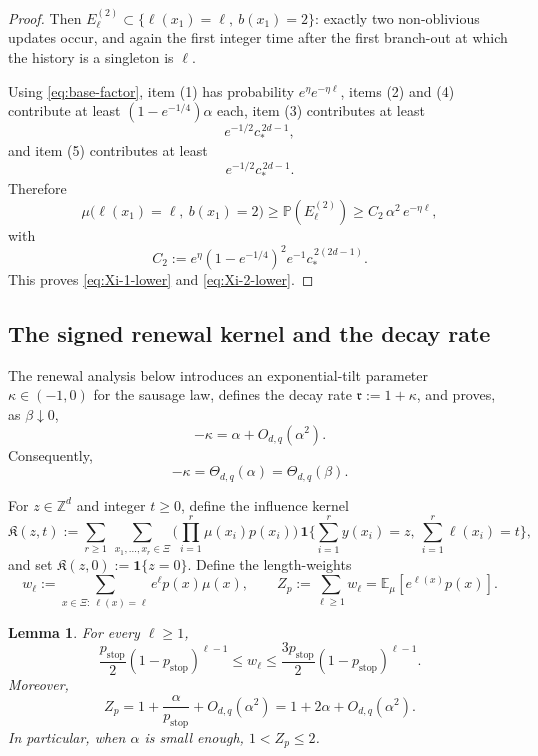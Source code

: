 \documentclass[letterpaper,11pt,reqno]{amsart}
\newtheorem{lemma}[thm]{Lemma}
\theoremstyle{definition}
\newcommand{\IK}{\mathfrak{K}}
\begin{document}
\begin{proof}
Then \(E^{(2)}_\ell\subset\{\ell(x_1)=\ell,\ b(x_1)=2\}\): exactly two non-oblivious updates occur, and again the first integer time after the first branch-out at which the history is a singleton is \(\ell\).

Using \eqref{eq:base-factor}, item (1) has probability \(e^\eta e^{-\eta\ell}\), items (2) and (4) contribute at least \((1-e^{-1/4})\alpha\) each, item (3) contributes at least
\[
e^{-1/2}c_*^{\,2d-1},
\]
and item (5) contributes at least
\[
e^{-1/2}c_*^{\,2d-1}.
\]
Therefore
\[
\mu\big(\ell(x_1)=\ell,\ b(x_1)=2\big)\ge \mathbb P(E^{(2)}_\ell)
\ge
C_2\,\alpha^2\,e^{-\eta\ell},
\]
with
\[
C_2:=e^\eta(1-e^{-1/4})^2e^{-1}c_*^{\,2(2d-1)}.
\]
This proves \eqref{eq:Xi-1-lower} and \eqref{eq:Xi-2-lower}.
\end{proof}



\subsection{The signed renewal kernel and the decay rate}
\label{subsec:signed-kernel}
The renewal analysis below introduces an exponential-tilt parameter
\(\kappa\in(-1,0)\) for the sausage law, defines the decay rate
\(\mathfrak r:=1+\kappa\), and proves, as \(\beta\downarrow0\),
\[
-\kappa=\alpha+O_{d,q}(\alpha^2).
\]
Consequently,
\[
-\kappa
=\Theta_{d,q}(\alpha)
=\Theta_{d,q}(\beta).
\]

For $z\in\mathbb Z^d$ and integer $t\ge0$, define the influence kernel
\begin{equation}\label{eq:IK-def}
\IK(z,t):=
\sum_{r\ge 1}\ \sum_{x_1,\ldots,x_r\in\Xi}
\Big(\prod_{i=1}^{r}\mu(x_i)p(x_i)\Big)\,
\mathbf 1\Big\{\sum_{i=1}^r y(x_i)=z,\ \sum_{i=1}^r \ell(x_i)=t\Big\},
\end{equation}
and set $\IK(z,0):=\mathbf 1\{z=0\}$.
Define the length-weights
\begin{equation*}
w_\ell:=\sum_{x\in\Xi:\ \ell(x)=\ell}e^{\ell}p(x)\mu(x),
\qquad
Z_p:=\sum_{\ell\ge 1}w_\ell=\mathbb E_\mu[e^{\ell(x)}p(x)].
\end{equation*}


\begin{lemma}\label{lem:Zp-bound}
For every \(\ell\ge1\),
\begin{equation}\label{eq:w-ell}
    \frac{p_{\mathrm{stop}}}{2}(1-p_{\mathrm{stop}})^{\ell-1}
    \le
    w_\ell
    \le
    \frac{3p_{\mathrm{stop}}}{2}(1-p_{\mathrm{stop}})^{\ell-1}.
\end{equation}
Moreover,
\begin{equation}\label{eq:Zp}
    Z_p
    =
    1+\frac{\alpha}{p_{\mathrm{stop}}}+O_{d,q}(\alpha^2)=1+2\alpha+O_{d,q}(\alpha^2).
\end{equation}
In particular, when $\alpha$ is small enough, \(1<Z_p\le2\).
\end{lemma}
\end{document}
